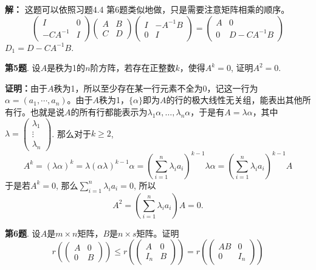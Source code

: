 {\bf 解：} 这题可以依照习题4.4 第6题类似地做，只是需要注意矩阵相乘的顺序。
$$\begin{pmatrix} I & 0 \\ -CA^{-1} & I \end{pmatrix} \begin{pmatrix} A & B \\ C & D \end{pmatrix} \begin{pmatrix} I & -A^{-1}B \\ 0 & I \end{pmatrix} = \begin{pmatrix} A & 0 \\ 0 & D - CA^{-1}B \end{pmatrix}$$
$D_1 = D - CA^{-1}B$.

\newpageorvspace

{\bf 第5题}. 设$A$是秩为1的$n$阶方阵，若存在正整数$k$，使得$A^k = 0$, 证明$A^2 = 0$.

{\bf 证明：}由于$A$秩为1，所以至少存在某一行元素不全为0，记这一行为$\alpha = (a_1, \cdots, a_n)$。由于$A$秩为1，$\{\alpha\}$即为$A$的行的极大线性无关组，能表出其他所有行。也就是说$A$的所有行都能表示为$\lambda_1\alpha, \ldots, \lambda_n\alpha$，于是有$A = \lambda \alpha$，其中$\lambda = \begin{pmatrix}
\lambda_1 \\ \vdots \\ \lambda_n \end{pmatrix}$. 那么对于$k\geqslant 2$,
$$A^k = (\lambda\alpha)^k = \lambda (\alpha\lambda)^{k-1} \alpha = \left( \sum_{i=1}^n \lambda_i a_i \right)^{k-1} \lambda \alpha = \left( \sum_{i=1}^n \lambda_i a_i \right)^{k-1} A$$
于是若$A^k = 0$, 那么$\sum\limits_{i=1}^n \lambda_i a_i = 0$, 所以
$$A^2 = \left( \sum_{i=1}^n \lambda_i a_i \right) A = 0.$$

\newpageorvspace

{\bf 第6题}. 设$A$是$m\times n$矩阵，$B$是$n\times s$矩阵。证明
$$r(\begin{pmatrix} A & 0 \\ 0 & B \end{pmatrix}) \leqslant r(\begin{pmatrix} A & 0 \\ I_n & B \end{pmatrix}) = r(\begin{pmatrix} AB & 0 \\ 0 & I_n \end{pmatrix})$$

